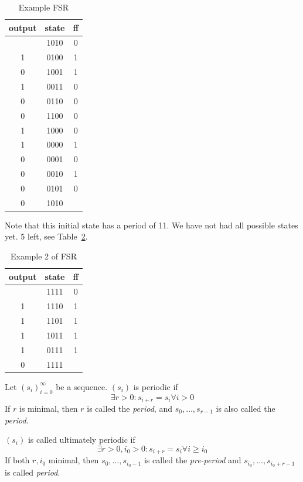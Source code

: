 \documentclass[language=english,number=]{homework}
\begin{document}
\begin{table}
\centering
\begin{tabular}{c|c|c}
output & state & ff \\ \hline
& 1010 &0 \\
1 & 0100 & 1 \\
0 & 1001 & 1 \\
1 & 0011 & 0 \\
0 & 0110 & 0 \\
0 & 1100 & 0 \\
1 & 1000 & 0 \\
1 & 0000 & 1 \\
0 & 0001 & 0 \\
0 & 0010 & 1 \\
0 & 0101 & 0 \\
0 & 1010 & \\
\end{tabular}
\caption{Example FSR}
\label{exFSR}
\end{table}
Note that this initial state has a period of 11.
We have not had all possible states yet.
5 left, see Table~\ref{exFSR2}.

\begin{table}
\centering
\begin{tabular}{c|c|c}
output & state & ff \\ \hline
& 1111 & 0 \\
1 & 1110 & 1 \\
1 & 1101 & 1 \\
1 & 1011 & 1 \\
1 & 0111 & 1 \\
0 & 1111 &
\end{tabular}
\caption{Example 2 of FSR}
\label{exFSR2}
\end{table}

\begin{definition}[Periodic]
Let $(s_i)_{i=0}^{\infty}$ be a sequence.
$(s_i)$ is periodic if
\[
\exists r > 0 : s_{i+r} = s_i \forall i > 0
\]
If $r$ is minimal, then $r$ is called the \textit{period}, and $s_0, \dots, s_{r-1}$ is also called the \textit{period}.
\end{definition}

\begin{definition}
$(s_i)$ is called ultimately periodic if
\[
\exists r > 0, i_0 > 0 : s_{i+r} = s_{i} \forall i \ge i_0
\]
If both $r, i_0$ minimal, then $s_0, \dots, s_{i_0 - 1}$ is called the \textit{pre-period} and $s_{i_0}, \dots, s_{i_0 + r-1}$ is called \textit{period}.
\end{definition}
\end{document}

